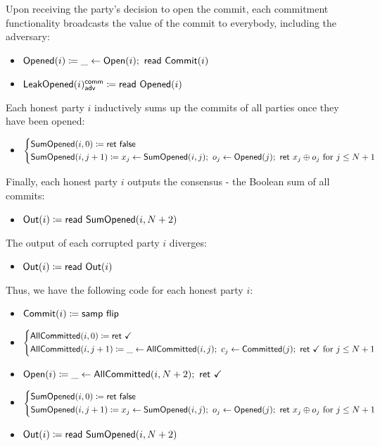 Upon receiving the party's decision to open the commit, each commitment functionality broadcasts the value of the commit to everybody, including the adversary:
\begin{itemize}
\item {\color{red} $\mathsf{Opened}(i) \coloneqq \_ \leftarrow \mathsf{Open}(i); \ \mathsf{read} \ \mathsf{Commit}(i)$}
\item {\color{red} $\mathsf{LeakOpened}(i)^{\mathsf{comm}}_{\mathsf{adv}} \coloneqq \mathsf{read} \ \mathsf{Opened}(i)$}
\end{itemize}
Each honest party $i$ inductively sums up the commits of all parties once they have been opened:
\begin{itemize}
\item {\color{red} $\begin{cases*} \SumOpened(i,0) \coloneqq \ret{\false} \\ \SumOpened(i,j+1) \coloneqq x_j \leftarrow \SumOpened(i,j); \ o_j \leftarrow \Opened(j); \ \ret{x_j \oplus o_j} \text{ for $j \leq N+1$} \end{cases*}$}
\end{itemize}
Finally, each honest party $i$ outputs the consensus - the Boolean sum of all commits:
\begin{itemize}
\item $\mathsf{Out}(i) \coloneqq \mathsf{read} \ \mathsf{SumOpened}(i,N+2)$
\end{itemize}
The output of each corrupted party $i$ diverges:
\begin{itemize}
\item $\mathsf{Out}(i) \coloneqq \mathsf{read} \ \mathsf{Out}(i)$
\end{itemize}
Thus, we have the following code for each honest party $i$:
\begin{itemize}
\item {\color{blue} $\mathsf{Commit}(i) \coloneqq \mathsf{samp} \ \mathsf{flip}$}
\item {\color{magenta} $\begin{cases*} \AllCommitted(i,0) \coloneqq \ret{\checkmark} \\ \AllCommitted(i,j+1) \coloneqq \_ \leftarrow \AllCommitted(i,j); \ c_j \leftarrow \Committed(j); \ \ret{\checkmark} \text{ for $j \leq N+1$} \end{cases*}$}
\item {\color{teal} $\Open(i) \coloneqq \_ \leftarrow \AllCommitted(i,N+2); \ \ret{\checkmark}$}
\item {\color{red} $\begin{cases*} \SumOpened(i,0) \coloneqq \ret{\false} \\ \SumOpened(i,j+1) \coloneqq x_j \leftarrow \SumOpened(i,j); \ o_j \leftarrow \Opened(j); \ \ret{x_j \oplus o_j} \text{ for $j \leq N+1$} \end{cases*}$}
\item $\mathsf{Out}(i) \coloneqq \mathsf{read} \ \mathsf{SumOpened}(i,N+2)$
\end{itemize}
